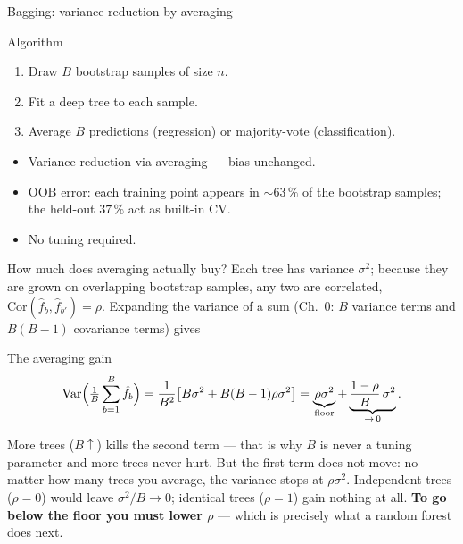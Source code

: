\documentclass[aspectratio=169,11pt]{beamer}
\begin{document}
\begin{frame}{Bagging: variance reduction by averaging}
  \begin{block}{Algorithm}
    \begin{enumerate}
      \item Draw $B$ bootstrap samples of size $n$.
      \item Fit a deep tree to each sample.
      \item Average $B$ predictions (regression) or majority-vote
            (classification).
    \end{enumerate}
  \end{block}
  \begin{takeaway}
    \begin{itemize}
      \item Variance reduction via averaging --- bias unchanged.
      \item OOB error: each training point appears in $\sim 63\,\%$
            of the bootstrap samples; the held-out $37\,\%$ act as
            built-in CV.
      \item No tuning required.
    \end{itemize}
  \end{takeaway}
\end{frame}

\begin{frame}{How much does averaging actually buy?}\label{frm:avggain}
  \footnotesize
  Each tree has variance $\sigma^2$; because they are grown on overlapping
  bootstrap samples, any two are correlated, $\mathrm{Cor}(\hat f_b, \hat
  f_{b'}) = \rho$. Expanding the variance of a sum (Ch.~0: $B$ variance terms
  and $B(B-1)$ covariance terms) gives
  \begin{block}{The averaging gain}
    \[
      \operatorname{Var}\Bigl(\tfrac1B \sum_{b=1}^{B}\hat f_b\Bigr)
        = \frac{1}{B^2}\bigl[B\sigma^2 + B(B-1)\rho\sigma^2\bigr]
        = \underbrace{\rho\sigma^2}_{\text{floor}}
          + \underbrace{\frac{1-\rho}{B}\,\sigma^2}_{\to\,0}.
    \]
  \end{block}
  \begin{takeaway}
    More trees ($B\uparrow$) kills the second term --- that is why $B$ is
    never a tuning parameter and more trees never hurt. But the first term
    does not move: no matter how many trees you average, the variance stops
    at $\rho\sigma^2$. Independent trees ($\rho = 0$) would leave
    $\sigma^2/B \to 0$; identical trees ($\rho = 1$) gain nothing at all.
    \textbf{To go below the floor you must lower $\rho$} --- which is
    precisely what a random forest does next.
  \end{takeaway}
\end{frame}
\end{document}

